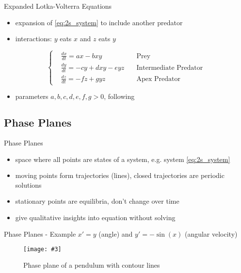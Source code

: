 \documentclass[hyperref={colorlinks,allcolors=black}]{beamer}
\newcommand{\makefig}[4]{
    \begin{figure}[#1]
        \captionsetup{justification=centering}
        \texttt{[image: \#3]}
        \caption{#4}
        \label{fig:#3}
    \end{figure}
}
\begin{document}
\begin{frame}{Expanded Lotka-Volterra Equations}
    \begin{itemize}\setlength\itemsep{1em}
        \item expansion of \eqref{eq:2s_system} to include another predator
        \item interactions: $y$ eats $x$ and $z$ eats $y$
    \end{itemize}
%   
    \begin{equation}
        \left\{\begin{aligned}
            &\frac{dx}{dt} = ax-bxy            &\text{Prey}\\
            &\frac{dy}{dt} = -cy+dxy-eyz \quad &\text{Intermediate Predator}\\
            &\frac{dz}{dt} = -fz+gyz           &\text{Apex Predator}
        \end{aligned}\right.
        \label{eq:3s_system}
    \end{equation}
%
    \begin{itemize}\setlength\itemsep{1em}
        \item parameters $a,b,c,d,e,f,g>0$, following \cite{chauvet}
    \end{itemize}
\end{frame}

\subsection{Phase Planes}

\begin{frame}{Phase Planes}
    \begin{itemize}\setlength\itemsep{1em}
        \item space where all points are states of a system, e.g. system
            \eqref{eq:2s_system}
        \item moving points form trajectories (lines), closed trajectories are
            periodic solutions 
        \item stationary points are equilibria, don't change over time
        \item give qualitative insights into equation without solving
            \cite{terman}
    \end{itemize}
\end{frame}

\begin{frame}{Phase Planes - Example}
    \centering
    $x'=y$ (angle) and $y'=-\sin(x)$ (angular velocity) 
    \makefig{h}{0.7\textheight}{example_phase_plane}
        {Phase plane of a pendulum with contour lines}
\end{frame}
\end{document}
